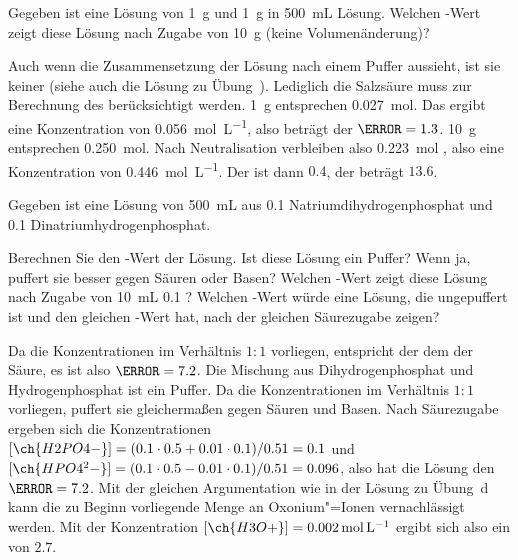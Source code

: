 \documentclass[DIV11]{scrartcl}
\begin{document}
\begin{question}
Gegeben ist eine Lösung von \SI{1}{\gram}  und \SI{1}{\gram} 
in \SI{500}{\milli\liter} Lösung.  Welchen \pH-Wert zeigt diese Lösung nach
Zugabe von \SI{10}{\gram}  (keine Volumenänderung)?
\end{question}
\begin{solution}
  Auch wenn die Zusammensetzung der Lösung nach einem Puffer aussieht, ist sie
  keiner (siehe auch die Lösung zu Übung~).  Lediglich
  die Salzsäure muss zur Berechnung des \pH{} berücksichtigt werden.
  \SI{1}{\gram}  entsprechen \SI{0.027}{\mole}.  Das ergibt eine
  Konzentration von \SI{0.056}{\mole\per\liter}, also beträgt der $\pH = 1.3$.
  \SI{10}{\gram}  entsprechen \SI{0.250}{\mole}.  Nach Neutralisation
  verbleiben also \SI{0.223}{\mole} , also eine Konzentration von
  \SI{0.446}{\mole\per\liter}.  Der \pOH{} ist dann $0.4$, der \pH{} beträgt
  $13.6$.
\end{solution}

\begin{question}
Gegeben ist eine Lösung von \SI{500}{\milli\liter} aus \SI{0.1}{\Molar}
Natriumdihydrogenphosphat und \SI{0.1}{\Molar} Dinatriumhydrogenphosphat.
\begin{tasks}
  \task Berechnen Sie den \pH-Wert der Lösung.
  \task Ist diese Lösung ein Puffer? Wenn ja, puffert sie besser gegen Säuren
    oder Basen?
  \task Welchen \pH-Wert zeigt diese Lösung nach Zugabe von
    \SI{10}{\milli\liter} \SI{0.1}{\Molar} ?
  \task Welchen \pH-Wert würde eine Lösung, die ungepuffert ist und den
    gleichen \pH-Wert hat, nach der gleichen Säurezugabe zeigen?
\end{tasks}
\end{question}
\begin{solution}
  \begin{tasks}
    \task Da die Konzentrationen im Verhältnis $1:1$ vorliegen, entspricht der
      \pH{} dem \pKa{} der Säure, es ist also $\pH = 7.2$.
    \task Die Mischung aus Dihydrogenphosphat und Hydrogenphosphat ist ein
      Puffer.  Da die Konzentrationen im Verhältnis $1:1$ vorliegen, puffert
      sie gleichermaßen gegen Säuren und Basen.
    \task Nach Säurezugabe ergeben sich die Konzentrationen $[\ch{H2PO4-}] =
      (0.1\cdot0.5 + 0.01\cdot0.1)/0.51 = 0.1$ und $[\ch{HPO4^2-}] =
      (0.1\cdot0.5 - 0.01\cdot0.1)/0.51 = 0.096$, also hat die Lösung den $\pH
      = 7.2$.
    \task Mit der gleichen Argumentation wie in der Lösung zu
      Übung~d kann die zu Beginn vorliegende Menge an
      Oxonium"=Ionen vernachlässigt werden.  Mit der Konzentration
      $[\ch{H3O+}] = \SI{0.002}{\mole\per\liter}$ ergibt sich also ein \pH{}
      von $2.7$.
  \end{tasks}
\end{solution}
\end{document}
